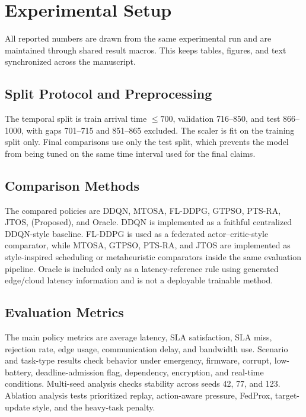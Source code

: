 \section{Experimental Setup}
\label{sec:experimental_setup}

All reported numbers are drawn from the same experimental run and are maintained through shared result macros. This keeps tables, figures, and text synchronized across the manuscript.

\subsection{Split Protocol and Preprocessing}

The temporal split is train arrival time $\leq 700$, validation 716--850, and test 866--1000, with gaps 701--715 and 851--865 excluded. The scaler is fit on the training split only. Final comparisons use only the test split, which prevents the model from being tuned on the same time interval used for the final claims.



\subsection{Comparison Methods}

The compared policies are DDQN, MTOSA, FL-DDPG, GTPSO, PTS-RA, JTOS, \fedddqn{} (Proposed), and Oracle. DDQN is implemented as a faithful centralized DDQN-style baseline.
FL-DDPG is used as a federated actor--critic-style comparator, while MTOSA, GTPSO, PTS-RA, and JTOS are implemented as style-inspired scheduling or metaheuristic comparators inside the same evaluation pipeline. Oracle is included only as a latency-reference rule using generated edge/cloud latency information and is not a deployable trainable method.



\subsection{Evaluation Metrics}

The main policy metrics are average latency, SLA satisfaction, SLA miss, rejection rate, edge usage, communication delay, and bandwidth use. Scenario and task-type results check behavior under emergency, firmware, corrupt, low-battery, deadline-admission flag, dependency, encryption, and real-time conditions. Multi-seed analysis checks stability across seeds 42, 77, and 123. Ablation analysis tests prioritized replay, action-aware pressure, FedProx, target-update style, and the heavy-task penalty.

